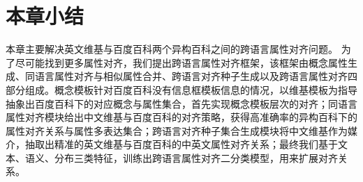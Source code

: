 \section{本章小结}
本章主要解决英文维基与百度百科两个异构百科之间的跨语言属性对齐问题。
为了尽可能找到更多属性对齐，我们提出跨语言属性对齐框架，该框架由概念属性生成、同语言属性对齐与相似属性合并、跨语言对齐种子生成以及跨语言属性对齐四部分组成。概念模板针对百度百科没有信息框模板信息的情况，以维基模板为指导抽象出百度百科下的对应概念与属性集合，首先实现概念模板层次的对齐；同语言属性对齐模块给出中文维基与百度百科的对齐策略，获得高准确率的异构百科下的属性对齐关系与属性多表达集合；跨语言对齐种子集合生成模块将中文维基作为媒介，抽取出精准的英文维基与百度百科的中英文属性对齐关系；最终我们基于文本、语义、分布三类特征，训练出跨语言属性对齐二分类模型，用来扩展对齐关系。

